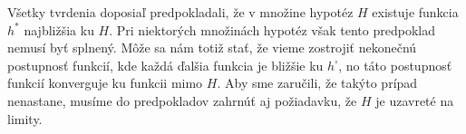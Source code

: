 \begin{remark}
  Všetky tvrdenia doposiaľ predpokladali, že v množine hypotéz $H$
  existuje funkcia $h^*$ najbližšia ku $H$. Pri niektorých množinách
  hypotéz však tento predpoklad nemusí byť splnený. Môže sa nám totiž
  stať, že vieme zostrojiť nekonečnú postupnosť funkcií, kde každá
  ďalšia funkcia je bližšie ku $h^\square$, no táto postupnosť funkcií
  konverguje ku funkcii mimo $H$. Aby sme zaručili, že takýto prípad
  nenastane, musíme do predpokladov zahrnúť aj požiadavku, že $H$ je
  uzavreté na limity.
\end{remark}
